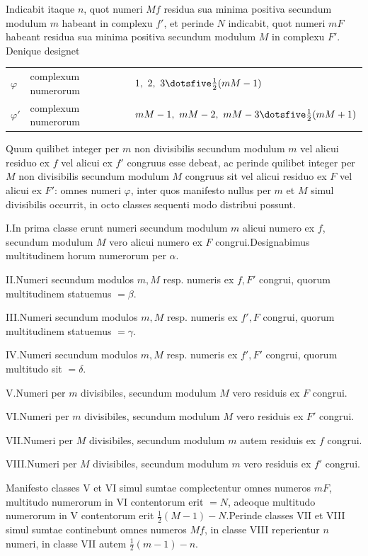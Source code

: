 Indicabit itaque $n$, quot numeri $Mf$ residua sua minima positiva secundum modulum $m$ habeant in complexu $f'$, et perinde $N$ indicabit, quot numeri $mF$ habeant residua sua minima positiva secundum modulum $M$ in complexu $F'$. Denique designet

{\small
\begin{center}\setlength{\tabcolsep}{3pt}
\begin{tabular}{@{}lll@{}}
$\varphi$ & complexum numerorum & $1,\ 2,\ 3\dotsfive\frac12(mM-1)$ \\
$\varphi'$ & complexum numerorum & $mM-1,\ mM-2,\ mM-3\dotsfive\frac12(mM+1)$
\end{tabular}\end{center}
}

Quum quilibet integer per $m$ non divisibilis secundum modulum $m$ vel alicui residuo ex $f$ vel alicui ex $f'$ congruus esse debeat, ac perinde quilibet integer per $M$ non divisibilis secundum modulum $M$ congruus sit vel alicui residuo ex $F$ vel alicui ex $F'$: omnes numeri $\varphi$, inter quos manifesto nullus per $m$ et $M$ simul divisibilis occurrit, in octo classes sequenti modo distribui possunt.

I.\quad In prima classe erunt numeri secundum modulum $m$ alicui numero ex $f$, secundum modulum $M$ vero alicui numero ex $F$ congrui.\quad Designabimus multitudinem horum numerorum per $\alpha$.

II.\quad Numeri secundum modulos $m,M$ resp. numeris ex $f,F'$ congrui, quorum multitudinem statuemus $=\beta$.

III.\quad Numeri secundum modulos $m,M$ resp. numeris ex $f',F$ congrui, quorum multitudinem statuemus $=\gamma$.

IV.\quad Numeri secundum modulos $m,M$ resp. numeris ex $f',F'$ congrui, quorum multitudo sit $=\delta$.

V.\quad Numeri per $m$ divisibiles, secundum modulum $M$ vero residuis ex $F$ congrui.

VI.\quad Numeri per $m$ divisibiles, secundum modulum $M$ vero residuis ex $F'$ congrui.

VII.\quad Numeri per $M$ divisibiles, secundum modulum $m$ autem residuis ex $f$ congrui.

VIII.\quad Numeri per $M$ divisibiles, secundum modulum $m$ vero residuis ex $f'$ congrui.

Manifesto classes V et VI simul sumtae complectentur omnes numeros $mF$, multitudo numerorum in VI contentorum erit $=N$, adeoque multitudo numerorum in V contentorum erit $\frac12(M-1)-N$.\quad Perinde classes VII et VIII simul sumtae continebunt omnes numeros $Mf$, in classe VIII reperientur $n$ numeri, in classe VII autem $\frac12(m-1)-n$.

